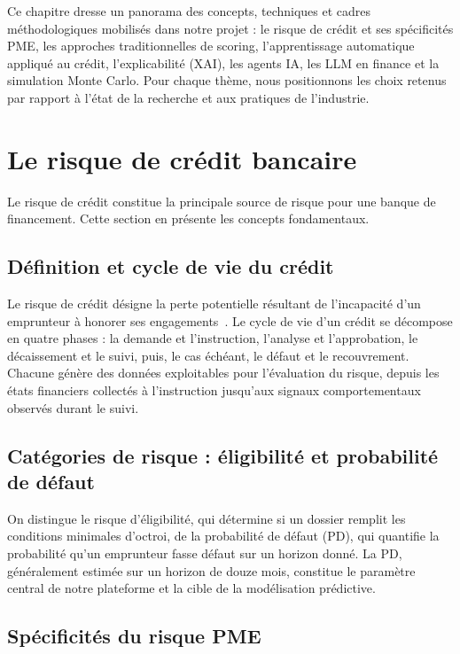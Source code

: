 \documentclass[a4paper,12pt,oneside]{report}
\begin{document}
Ce chapitre dresse un panorama des concepts, techniques et cadres méthodologiques mobilisés
dans notre projet : le risque de crédit et ses spécificités PME, les approches traditionnelles
de scoring, l'apprentissage automatique appliqué au crédit, l'explicabilité (XAI), les agents
IA, les LLM en finance et la simulation Monte Carlo. Pour chaque thème, nous positionnons les
choix retenus par rapport à l'état de la recherche et aux pratiques de l'industrie.

\section{Le risque de crédit bancaire}

Le risque de crédit constitue la principale source de risque pour une banque de financement.
Cette section en présente les concepts fondamentaux.

\subsection{Définition et cycle de vie du crédit}

Le risque de crédit désigne la perte potentielle résultant de l'incapacité d'un emprunteur
à honorer ses engagements~\cite{thomas2002}. Le cycle de vie d'un crédit se décompose en quatre
phases : la demande et l'instruction, l'analyse et l'approbation, le décaissement et le suivi,
puis, le cas échéant, le défaut et le recouvrement. Chacune génère des données exploitables
pour l'évaluation du risque, depuis les états financiers collectés à l'instruction jusqu'aux
signaux comportementaux observés durant le suivi.

\subsection{Catégories de risque : éligibilité et probabilité de défaut}

On distingue le risque d'éligibilité, qui détermine si un dossier remplit les conditions
minimales d'octroi, de la probabilité de défaut (PD), qui quantifie la probabilité qu'un
emprunteur fasse défaut sur un horizon donné. La PD, généralement estimée sur un horizon de
douze mois, constitue le paramètre central de notre plateforme et la cible de la modélisation
prédictive.

\subsection{Spécificités du risque PME}
\end{document}

